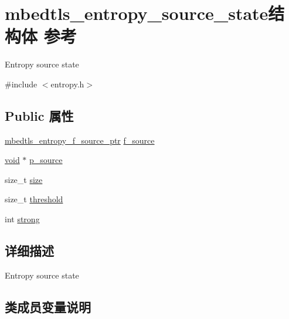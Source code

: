 \hypertarget{structmbedtls__entropy__source__state}{}\section{mbedtls\+\_\+entropy\+\_\+source\+\_\+state结构体 参考}
\label{structmbedtls__entropy__source__state}


Entropy source state  




{\ttfamily \#include $<$entropy.\+h$>$}

\subsection*{Public 属性}
\begin{DoxyCompactItemize}
\item 
\hyperlink{entropy_8h_a2168f0720e2e869e440fd7fa35c941bd}{mbedtls\+\_\+entropy\+\_\+f\+\_\+source\+\_\+ptr} \hyperlink{structmbedtls__entropy__source__state_afa26f990bd3ae555a84bdee710fd5844}{f\+\_\+source}
\item 
\hyperlink{interfacevoid}{void} $\ast$ \hyperlink{structmbedtls__entropy__source__state_ac290f929e3382e26443b6625ab9a0d78}{p\+\_\+source}
\item 
size\+\_\+t \hyperlink{structmbedtls__entropy__source__state_a395d9641c3aa0cddd5b1977c9e2a6aba}{size}
\item 
size\+\_\+t \hyperlink{structmbedtls__entropy__source__state_ab5ac92f3c7acd5a47ee986fb915e9686}{threshold}
\item 
int \hyperlink{structmbedtls__entropy__source__state_a13f749f23a93d986357832477335ec83}{strong}
\end{DoxyCompactItemize}


\subsection{详细描述}
Entropy source state 

\subsection{类成员变量说明}
\mbox{\label{structmbedtls__entropy__source__state_afa26f990bd3ae555a84bdee710fd5844}} 
